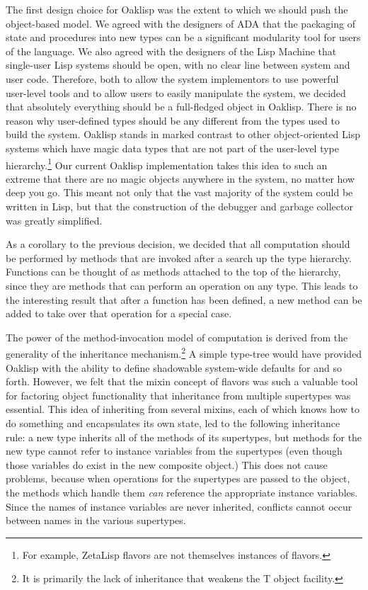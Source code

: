 The first design choice for Oaklisp was the extent to which we should
push the object-based model.  We agreed with the designers of ADA that
the packaging of state and procedures into new types can be a
significant modularity tool for users of the language.  We also agreed
with the designers of the Lisp Machine that single-user Lisp systems
should be open, with no clear line between system and user code.
Therefore, both to allow the system implementors to use powerful
user-level tools and to allow users to easily manipulate the system,
we decided that absolutely everything should be a full-fledged object
in Oaklisp.  There is no reason why user-defined types should be any
different from the types used to build the system.  Oaklisp stands in
marked contrast to other object-oriented Lisp systems which have magic
data types that are not part of the user-level type
hierarchy.\footnote{For example, ZetaLisp flavors are not themselves
instances of flavors.} Our current Oaklisp implementation takes this
idea to such an extreme that there are no magic objects anywhere in
the system, no matter how deep you go.  This meant not only that the
vast majority of the system could be written in Lisp, but that the
construction of the debugger and garbage collector was greatly
simplified.

As a corollary to the previous decision, we decided that all
computation should be performed by methods that are invoked after a
search up the type hierarchy.  Functions can be thought of as methods
attached to the top of the hierarchy, since they are methods that can
perform an operation on any type.  This leads to the interesting
result that after a function has been defined, a new method can be
added to take over that operation for a special case.

The power of the method-invocation model of computation is derived
from the generality of the inheritance mechanism.\footnote{It is
primarily the lack of inheritance that weakens the T object facility.}
A simple type-tree would have provided Oaklisp with the ability to
define shadowable system-wide defaults for  and so forth.
However, we felt that the mixin concept of flavors was such a valuable
tool for factoring object functionality that inheritance from multiple
supertypes was essential.  This idea of inheriting from several
mixins, each of which knows how to do something and encapsulates its
own state, led to the following inheritance rule: a new type inherits
all of the methods of its supertypes, but methods for the new type
cannot refer to instance variables from the supertypes (even though
those variables do exist in the new composite object.) This does not
cause problems, because when operations for the supertypes are passed
to the object, the methods which handle them \emph{can} reference the
appropriate instance variables.  Since the names of instance variables
are never inherited, conflicts cannot occur between names in the
various supertypes.

